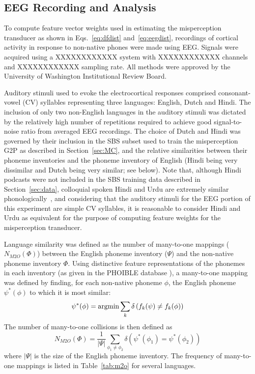 \subsection{EEG Recording and Analysis}
To compute feature vector weights used in estimating the misperception
transducer as shown in Eqs.~\ref{eq:dfdist} and~\ref{eq:eegdist},
recordings of cortical activity in response to non-native phones were
made using EEG. Signals were acquired using a XXXXXXXXXXXX system with
XXXXXXXXXXXX channels and XXXXXXXXXXXX sampling rate.
All methods were approved by the University of Washington Institutional
Review Board.

Auditory stimuli used to evoke the electrocortical responses comprised
consonant-vowel (CV) syllables representing three languages: English,
Dutch and Hindi. The inclusion of only two non-English languages in the
auditory stimuli was dictated by the relatively high number of
repetitions required to achieve good signal-to-noise ratio from averaged
EEG recordings. The choice of Dutch and Hindi was governed by their
inclusion in the SBS subset used to train the misperception G2P as
described in Section~\ref{sec:MC}, and the relative similarities
between their phoneme inventories and the phoneme inventory of English
(Hindi being very dissimilar and Dutch being very similar; see below).
Note that, although Hindi podcasts were not included in the SBS training
data described in Section~\ref{sec:data}, colloquial spoken Hindi and
Urdu are extremely similar phonologically~\cite{Kachru90}, and
considering that the auditory stimuli for the EEG portion of this
experiment are simple CV syllables, it is reasonable to consider Hindi
and Urdu as equivalent for the purpose of computing feature weights for
the misperception transducer.

Language similarity was defined as the number of many-to-one mappings
($N_{M2O}(\mathbb{\Phi})$) between the English phoneme inventory
($\mathbb{\Psi}$) and the non-native phoneme inventory $\mathbb{\Phi}$.
Using distinctive feature representations of the phonemes in each
inventory (as given in the PHOIBLE database \cite{PHOIBLE}), a
many-to-one mapping was defined by finding, for each
non-native phoneme $\phi$, the English phoneme $\psi^*(\phi)$ to which
it is most similar:
\begin{equation}
  \psi^*(\phi) = \operatorname*{argmin} \sum_k \delta\left(f_k(\psi)\ne f_k(\phi)\right)
\end{equation}
The number of many-to-one collisions is then defined as
\begin{equation}
  N_{M2O}(\mathbb{\Phi})=\frac{1}{|\mathbb{\Psi}|}\sum_{\phi_1\ne\phi_2}
  \delta\left(\psi^*(\phi_1)=\psi^*(\phi_2)\right)
\label{eq:m2o}
\end{equation}
where $|\mathbb{\Psi}|$ is the size of the English phoneme inventory.
The frequency of many-to-one mappings is listed in
Table~\ref{tab:m2o} for several languages.

